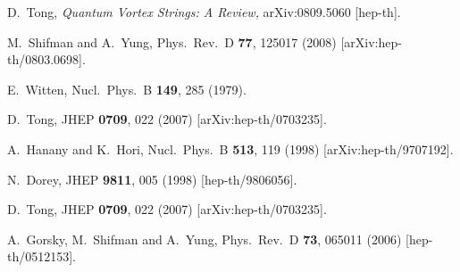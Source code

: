 \documentclass[12pt]{article}
\begin{document}
\begin{thebibliography}{99}
D.~Tong,
{\em Quantum Vortex Strings: A Review,}
  arXiv:0809.5060 [hep-th].
  



M.~Shifman and A.~Yung,
Phys.\ Rev.\ D {\bf 77}, 125017 (2008)
[arXiv:hep-th/0803.0698].

E.~Witten,
Nucl.\ Phys.\ B {\bf 149}, 285 (1979).


  D.~Tong,
  JHEP {\bf 0709}, 022 (2007)
  [arXiv:hep-th/0703235].


  
A.~Hanany and K.~Hori,
  Nucl.\ Phys.\  B {\bf 513}, 119 (1998)
  [arXiv:hep-th/9707192].
  
N.~Dorey,
JHEP {\bf 9811}, 005 (1998) [hep-th/9806056].

  D.~Tong,
  JHEP {\bf 0709}, 022 (2007)
  [arXiv:hep-th/0703235].
  
A.~Gorsky, M.~Shifman and A.~Yung,
 Phys.\ Rev.\  D {\bf 73}, 065011 (2006)
  [hep-th/0512153].


\end{thebibliography}
\end{document}
